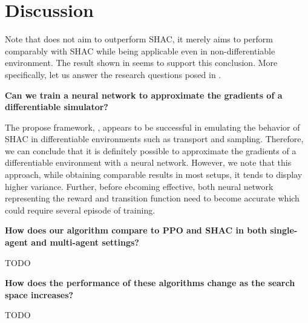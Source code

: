 \section{Discussion}

Note that \fname{} does not aim to outperform SHAC, it merely aims to perform comparably with SHAC while being applicable even in non-differentiable environment. The result shown in  seems to support this conclusion. More specifically, let us answer the research questions posed in .

\begin{center}
 \textbf{Can we train a neural network to approximate the gradients of a differentiable simulator?}
\end{center}

The propose framework, \fname{}, appears to be successful in emulating the behavior of SHAC in differentiable environments such as transport and sampling. Therefore, we can conclude that it is definitely possible to approximate the gradients of a differentiable environment with a neural network. However, we note that this approach, while obtaining comparable results in most setups, it tends to display higher variance. Further, before ebcoming effective, both neural network representing the reward and transition function need to become accurate which could require several episode of training.

\begin{center}
 \textbf{How does our algorithm compare to PPO and SHAC in both single-agent and multi-agent settings?}
\end{center}
TODO

\begin{center}
 \textbf{How does the performance of these algorithms change as the search space increases?}
\end{center}
TODO
